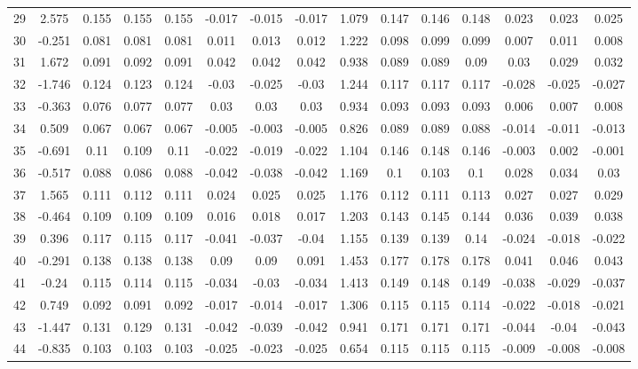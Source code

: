 \begin{table}[H]
{\begin{tabular}{l|c|ccc|ccc|c|ccc|ccc}
			29 & 2.575 & 0.155 & 0.155 & 0.155 & -0.017 & -0.015 & -0.017 & 1.079 & 0.147 & 0.146 & 0.148 & 0.023 & 0.023 & 0.025 \\
			30 & -0.251 & 0.081 & 0.081 & 0.081 & 0.011 & 0.013 & 0.012 & 1.222 & 0.098 & 0.099 & 0.099 & 0.007 & 0.011 & 0.008 \\
			31 & 1.672 & 0.091 & 0.092 & 0.091 & 0.042 & 0.042 & 0.042 & 0.938 & 0.089 & 0.089 & 0.09 & 0.03 & 0.029 & 0.032 \\
			32 & -1.746 & 0.124 & 0.123 & 0.124 & -0.03 & -0.025 & -0.03 & 1.244 & 0.117 & 0.117 & 0.117 & -0.028 & -0.025 & -0.027 \\
			33 & -0.363 & 0.076 & 0.077 & 0.077 & 0.03 & 0.03 & 0.03 & 0.934 & 0.093 & 0.093 & 0.093 & 0.006 & 0.007 & 0.008 \\
			34 & 0.509 & 0.067 & 0.067 & 0.067 & -0.005 & -0.003 & -0.005 & 0.826 & 0.089 & 0.089 & 0.088 & -0.014 & -0.011 & -0.013 \\
			35 & -0.691 & 0.11 & 0.109 & 0.11 & -0.022 & -0.019 & -0.022 & 1.104 & 0.146 & 0.148 & 0.146 & -0.003 & 0.002 & -0.001 \\
			36 & -0.517 & 0.088 & 0.086 & 0.088 & -0.042 & -0.038 & -0.042 & 1.169 & 0.1 & 0.103 & 0.1 & 0.028 & 0.034 & 0.03 \\
			37 & 1.565 & 0.111 & 0.112 & 0.111 & 0.024 & 0.025 & 0.025 & 1.176 & 0.112 & 0.111 & 0.113 & 0.027 & 0.027 & 0.029 \\
			38 & -0.464 & 0.109 & 0.109 & 0.109 & 0.016 & 0.018 & 0.017 & 1.203 & 0.143 & 0.145 & 0.144 & 0.036 & 0.039 & 0.038 \\
			39 & 0.396 & 0.117 & 0.115 & 0.117 & -0.041 & -0.037 & -0.04 & 1.155 & 0.139 & 0.139 & 0.14 & -0.024 & -0.018 & -0.022 \\
			40 & -0.291 & 0.138 & 0.138 & 0.138 & 0.09 & 0.09 & 0.091 & 1.453 & 0.177 & 0.178 & 0.178 & 0.041 & 0.046 & 0.043 \\
			41 & -0.24 & 0.115 & 0.114 & 0.115 & -0.034 & -0.03 & -0.034 & 1.413 & 0.149 & 0.148 & 0.149 & -0.038 & -0.029 & -0.037 \\
			42 & 0.749 & 0.092 & 0.091 & 0.092 & -0.017 & -0.014 & -0.017 & 1.306 & 0.115 & 0.115 & 0.114 & -0.022 & -0.018 & -0.021 \\
			43 & -1.447 & 0.131 & 0.129 & 0.131 & -0.042 & -0.039 & -0.042 & 0.941 & 0.171 & 0.171 & 0.171 & -0.044 & -0.04 & -0.043 \\
			44 & -0.835 & 0.103 & 0.103 & 0.103 & -0.025 & -0.023 & -0.025 & 0.654 & 0.115 & 0.115 & 0.115 & -0.009 & -0.008 & -0.008 \\

\end{tabular}}
\end{table}
